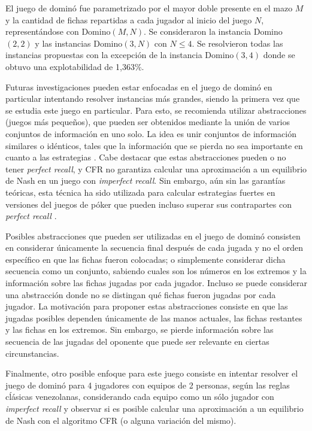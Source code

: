 El juego de dominó fue parametrizado por el mayor doble presente en el mazo $M$ y la cantidad de fichas repartidas a cada jugador al inicio del juego $N$, representándose con Domino$(M, N)$. Se consideraron la instancia Domino$(2, 2)$ y las instancias Domino$(3, N)$ con $N \leq 4$. Se resolvieron todas las instancias propuestas con la excepción de la instancia Domino$(3, 4)$ donde se obtuvo una explotabilidad de 1,363\%.

Futuras investigaciones pueden estar enfocadas en el juego de dominó en particular intentando resolver instancias más grandes, siendo la primera vez que se estudia este juego en particular. Para esto, se recomienda utilizar abstracciones (juegos más pequeños), que pueden ser obtenidos mediante la unión de varios conjuntos de información en uno solo. La idea es unir conjuntos de información similares o idénticos, tales que la información que se pierda no sea importante en cuanto a las estrategias \cite[pp.~71-72]{bib:thesis-marc-lanctot}. Cabe destacar que estas abstracciones pueden o no tener \textit{perfect recall}, y CFR no garantiza calcular una aproximación a un equilibrio de Nash en un juego con \textit{imperfect recall}. Sin embargo, aún sin las garantías teóricas, esta técnica ha sido utilizada para calcular estrategias fuertes en versiones del juegos de póker que pueden incluso superar sus contrapartes con \textit{perfect recall} \cite{bib:imperfect-recall}.

Posibles abstracciones que pueden ser utilizadas en el juego de dominó consisten en considerar únicamente la secuencia final después de cada jugada y no el orden específico en que las fichas fueron colocadas; o simplemente considerar dicha secuencia como un conjunto, sabiendo cuales son los números en los extremos y la información sobre las fichas jugadas por cada jugador. Incluso se puede considerar una abstracción donde no se distingan qué fichas fueron jugadas por cada jugador. La motivación para proponer estas abstracciones consiste en que las jugadas posibles dependen únicamente de las manos actuales, las fichas restantes y las fichas en los extremos. Sin embargo, se pierde información sobre las secuencia de las jugadas del oponente que puede ser relevante en ciertas circunstancias.

Finalmente, otro posible enfoque para este juego consiste en intentar resolver el juego de dominó para 4 jugadores con equipos de 2 personas, según las reglas cĺásicas venezolanas, considerando cada equipo como un sólo jugador con \textit{imperfect recall} y observar si es posible calcular una aproximación a un equilibrio de Nash con el algoritmo CFR (o alguna variación del mismo).
